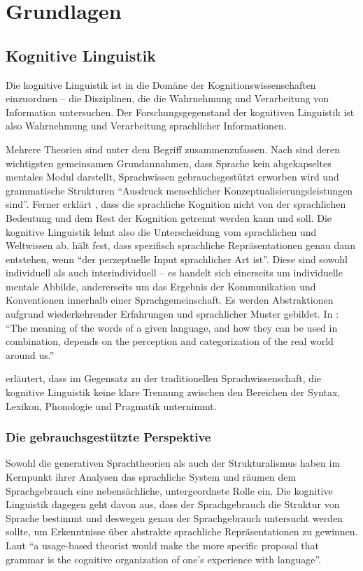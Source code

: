 \section{Grundlagen}

\subsection{Kognitive Linguistik}

Die kognitive Linguistik ist in die Domäne der Kognitionswissenschaften einzuordnen -- die Disziplinen, die die Wahrnehmung und Verarbeitung von Information untersuchen.
Der Forschungsgegenstand der kognitiven Linguistik ist also Wahrnehmung und Verarbeitung sprachlicher Informationen.

Mehrere Theorien sind unter dem Begriff zusammenzufassen.
Nach \cite{Ziem13} sind deren wichtigsten gemeinsamen Grundannahmen, dass Sprache kein abgekapseltes mentales Modul darstellt, Sprachwissen gebrauchsgestützt erworben wird und grammatische Strukturen ``Ausdruck menschlicher Konzeptualisierungsleistungen sind''.
Ferner erklärt \cite{Ellis08}, dass die sprachliche Kognition nicht von der sprachlichen Bedeutung und dem Rest der Kognition getrennt werden kann und soll.
Die kognitive Linguistik lehnt also die Unterscheidung vom sprachlichen und Weltwissen ab.
\cite{Ziem08} hält fest, dass spezifisch sprachliche Repräsentationen genau dann entstehen, wenn ``der perzeptuelle Input sprachlicher Art ist''.
Diese sind sowohl individuell als auch interindividuell -- es handelt sich einerseits um individuelle mentale Abbilde, andererseits um das Ergebnis der Kommunikation und Konventionen innerhalb einer Sprachgemeinschaft.
Es werden Abstraktionen aufgrund wiederkehrender Erfahrungen und sprachlicher Muster gebildet.
In \cite{Ellis08}: ``The meaning of the words of a given language, and how they can be used in combination, depends on the perception and categorization of the real world around us.''

\cite{Ellis08} erläutert, dass im Gegensatz zu der traditionellen Sprachwissenschaft, die kognitive Linguistik keine klare Trennung zwischen den Bereichen der Syntax, Lexikon, Phonologie und Pragmatik unternimmt.

\subsubsection{Die gebrauchsgestützte Perspektive}
Sowohl die generativen Sprachtheorien als auch der Strukturalismus haben im Kernpunkt ihrer Analysen das sprachliche System und räumen dem Sprachgebrauch eine nebensächliche, untergeordnete Rolle ein.
Die kognitive Linguistik dagegen geht davon aus, dass der Sprachgebrauch die Struktur von Sprache bestimmt und deswegen genau der Sprachgebrauch untersucht werden sollte, um Erkenntnisse über abstrakte sprachliche Repräsentationen zu gewinnen.
Laut \cite{Bybee06} ``a usage-based theorist would make the more specific proposal that grammar is the cognitive organization of one’s experience with language''.

